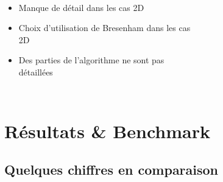 \begin{frame}[fragile=singleslide]{\insertsectionhead}
  \framesubtitle{\insertsubsectionhead}
  \begin{columns}[T,onlytextwidth]
      \begin{itemize}
        \vspace{.85cm}
        \item Manque de détail dans les cas 2D
        \vspace{.3cm}
        \item Choix d’utilisation de Bresenham dans les cas 2D
        \vspace{.3cm}
        \item Des parties de l'algorithme ne sont pas détaillées
      \end{itemize}
    \begin{figure}
        \begin{subfigure}{.9\textwidth}
        \end{subfigure}
      \end{figure}
  \end{columns}
\end{frame}

\section{Résultats \& Benchmark}

\subsection{Quelques chiffres en comparaison}

